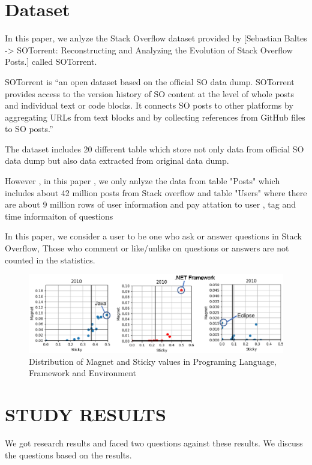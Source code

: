 \documentclass[conference]{IEEEtran}
\begin{document}
\section{Dataset}
In this paper, we anlyze the Stack Overflow dataset provided by [Sebastian Baltes -> SOTorrent: Reconstructing and Analyzing the Evolution of Stack Overflow Posts.] called SOTorrent. 

SOTorrent is “an open dataset based on the official SO data dump. SOTorrent provides access to the version history of SO content at the level of whole posts and individual text or code blocks. It connects SO posts to other platforms by aggregating URLs from text blocks and by collecting references from GitHub files to SO posts.”

The dataset includes 20 different table which store not only data from official SO data dump but also data extracted from original data dump.

However , in this paper , we only anlyze the data from table "Posts" which includes about 42 million posts from Stack overflow and table "Users" where there are about 9 million rows of user information and pay attation to user , tag and time informaiton of questions

In this paper, we consider a user to be one who ask or answer questions in Stack Overflow, Those who comment or like/unlike on questions or answers are not counted in the statistics.

\begin{figure}[t]
 \centering
 \includegraphics[width=.9\hsize]{img/2010magsti.eps}  
 \caption{Distribution of Magnet and Sticky values in Programing Language, Framework and Environment} 
 \label{plotframe2010} 
\end{figure}


\smallskip
\smallskip



\section{STUDY RESULTS} %
We got research results and faced two questions against these results. We discuss the questions based on the results.
\smallskip
\smallskip
\end{document}
